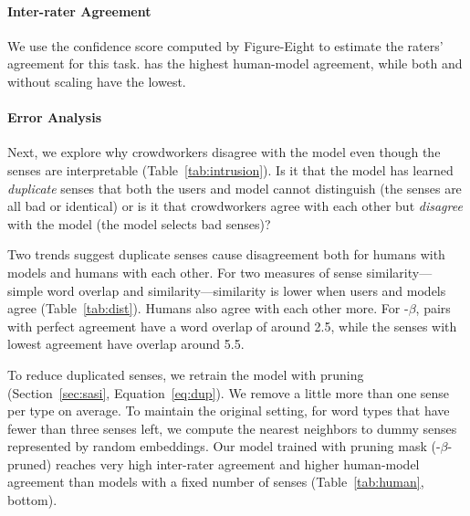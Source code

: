  
\paragraph{Inter-rater Agreement} 

We use the confidence score computed by Figure-Eight to estimate the
raters' agreement for this task. \gasi{-$\beta$} has
the highest human-model agreement, while both  and \gasi{}
without scaling have the lowest.





 
\paragraph{Error Analysis}

Next, we explore why crowdworkers disagree with the model even though
the senses are interpretable (Table~\ref{tab:intrusion}).
Is it that the model has learned \emph{duplicate} senses that both the
users and model cannot distinguish (the senses are all bad or
identical) or is it that crowdworkers agree with each other but
\emph{disagree} with the model (the model selects bad senses)?

Two trends suggest duplicate senses cause disagreement both for humans
with models and humans with each other.
For two measures of sense similarity---simple word overlap and
\glove{} similarity---similarity is lower when users and models agree
(Table~\ref{tab:dist}).
Humans also agree with each other more.  For \gasi{}-$\beta$, pairs with
perfect agreement have a word overlap of around 2.5, while the senses
with lowest agreement have overlap around 5.5.

To reduce duplicated senses, we
retrain the model with pruning (Section~\ref{sec:sasi}, Equation~\ref{eq:dup}).
We remove a little more than one sense per type on average.
To maintain the original setting, for word types that have fewer than three
senses left, we compute the nearest neighbors to dummy senses 
represented by random embeddings.
Our model trained with pruning mask 
(\gasi-$\beta$-pruned) reaches very high inter-rater agreement and higher
human-model agreement than models with 
a fixed number of senses (Table~\ref{tab:human}, bottom).